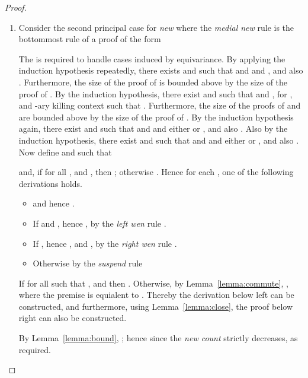 \begin{proof}
\begin{enumerate}[label=\textbf{\Alph*},ref=\Alph*,leftmargin=*]
\begin{enumerate}[label*=\textbf{.\arabic*}]
\begin{comment}
where  is provable.
By, the induction hypothesis, there exist formulae  and  where  and either  or , for , and -ary killing context such that the following holds:
.
Furthermore, the size of the proof of  is bounded above by the size of the proof of ; thereby strictly bounded by the size of the proof of .

If , define  and if  define  .
In the cases where , since , .
In the cases where , .
Hence the following derivation can be constructed, as required.

\end{comment}


\item Consider the second principal case for \textit{new} where the \textit{medial new} rule is the bottommost rule of a proof of the form

The  is required to handle cases induced by equivariance.
By applying the induction hypothesis repeatedly, 
there exists  and  such that  and
 and , and also .
Furthermore, the size of the proof of  is bounded above by the size of the proof of .
By the induction hypothesis, there exist  and  such that  and , for , and -ary killing context such that 
.
Furthermore, the size of the proofs of  and  are bounded above by the size of the proof of .
By the induction hypothesis again, there exist  and  such that  and  and either  or ,
and also
.
Also by the induction hypothesis, there exist  and  such that  and  and either  or , 
and also
.
Now define  and  such that

and, 
if for all ,  and , then ;
otherwise .
Hence for each , one of the following derivations holds.
\begin{itemize}
\item 
 and  hence
.

\item
If  and , hence , by the \textit{left wen} rule
.

\item
If , hence , and , by the \textit{right wen} rule
.

\item
Otherwise by the \textit{suspend} rule 
\end{itemize}
If for all  such that ,  and  then . Otherwise, by Lemma~\ref{lemma:commute},
, where the premise is equialent to .
Thereby the  derivation below left can be constructed, and furthermore, using Lemma~\ref{lemma:close}, 
the proof below right can also be constructed.




By Lemma~\ref{lemma:bound},
; hence  since the \textit{new count} strictly decreases, as required.
\begin{comment}
Consider the third principal case for \textit{new} where the \textit{medial new} rule is the bottommost rule of a proof of the form


\end{comment}
\end{enumerate}
\end{enumerate}
\end{proof}
